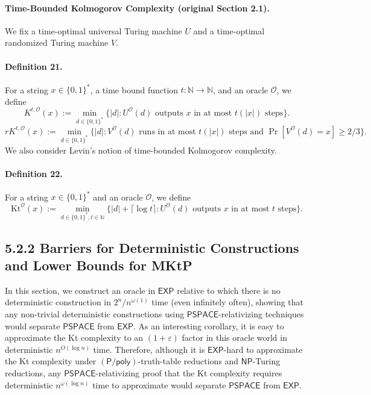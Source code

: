 \paragraph{Time-Bounded Kolmogorov Complexity (original Section 2.1).}
We fix a time-optimal universal Turing machine $U$ and a time-optimal randomized Turing machine $V$.
\paragraph{Definition 21.} For a string $x\in\{0,1\}^*$, a time bound function $t:\mathbb N\to\mathbb N$, and an oracle $\mathcal O$, we define
\[K^{t,\mathcal O}(x):=\min_{d\in\{0,1\}^*}\{|d|:U^{\mathcal O}(d)\text{ outputs }x\text{ in at most }t(|x|)\text{ steps}\}.\]
\[rK^{t,\mathcal O}(x):=\min_{d\in\{0,1\}^*}\{|d|:V^{\mathcal O}(d)\text{ runs in at most }t(|x|)\text{ steps and }\Pr[V^{\mathcal O}(d)=x]\geq2/3\}.\]
We also consider Levin's notion of time-bounded Kolmogorov complexity.
\paragraph{Definition 22.} For a string $x\in\{0,1\}^*$ and an oracle $\mathcal O$, we define
\[\mathrm{Kt}^{\mathcal O}(x):=\min_{d\in\{0,1\}^*,t\in\mathbb N}\{|d|+\lceil\log t\rceil:U^{\mathcal O}(d)\text{ outputs }x\text{ in at most }t\text{ steps}\}.\]
\subsection*{5.2.2 Barriers for Deterministic Constructions and Lower Bounds for MKtP}
In this section, we construct an oracle in $\mathsf{EXP}$ relative to which there is no deterministic construction in $2^n/n^{\omega(1)}$ time (even infinitely often), showing that any non-trivial deterministic constructions using $\mathsf{PSPACE}$-relativizing techniques would separate $\mathsf{PSPACE}$ from $\mathsf{EXP}$.
As an interesting corollary, it is easy to approximate the Kt complexity to an $(1+\varepsilon)$ factor in this oracle world in deterministic $n^{O(\log n)}$ time. Therefore, although it is $\mathsf{EXP}$-hard to approximate the Kt complexity under $(\mathsf{P/poly})$-truth-table reductions and $\mathsf{NP}$-Turing reductions, any $\mathsf{PSPACE}$-relativizing proof that the Kt complexity requires deterministic $n^{\omega(\log n)}$ time to approximate would separate $\mathsf{PSPACE}$ from $\mathsf{EXP}$.
